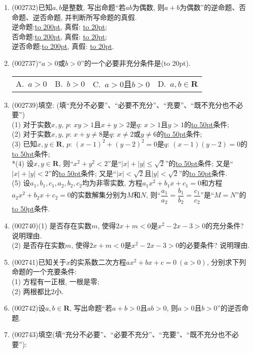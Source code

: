 \documentclass[10pt,a4paper]{article}
\newcommand{\blank}[1]{\underline{\hbox to #1pt{}}}
\newcommand{\bracket}[1]{(\hbox to #1pt{})}
\newcommand{\fourch}[4]{\par\begin{tabular}{p{.23\textwidth}p{.23\textwidth}p{.23\textwidth}p{.23\textwidth}}
A.~#1 &B.~#2& C.~#3& D.~#4
\end{tabular}}
\begin{document}
\begin{enumerate}[1.]
(1) $m\le 0$或$n>0$: \blank{200};\\
(2) 空间三条直线$l,m,n$两两相交: \blank{200};\\
(3) 复数$z_1,z_2,z_3$中至多一个为纯虚数: \blank{200}.
\item {\tiny (002732)}已知$a,b$是整数, 写出命题``若$ab$为偶数, 则$a+b$为偶数''的逆命题、否命题、逆否命题, 并判断所写命题的真假.\\
逆命题:\blank{200}, 真假: \blank{20};\\
否命题:\blank{200}, 真假: \blank{20};\\
逆否命题:\blank{200}, 真假: \blank{20}.
\item {\tiny (002737)}``$a>0$或$b>0$''的一个必要非充分条件是\bracket{20}.
\fourch{$a>0$}{$b>0$}{$a>0$且$b>0$}{$a,b\in \mathbf{R}$}
\item {\tiny (002739)}填空: (填``充分不必要''、``必要不充分''、``充要''、``既不充分也不必要'')\\ 
(1) 对于实数$x,y$, $p$: $xy>1$且$x+y>2$是$q$: $x>1$且$y>1$的\blank{50}条件;\\
(2) 对于实数$x,y$, $p$: $x+y\ne 8$是$q$: $x\ne 2$或$y\ne 6$的\blank{50}条件;\\
(3) 已知$x,y\in \mathbf{R}$, $p$: $(x-1)^2+(y-2)^2=0$是$q$: $(x-1)(y-2)=0$的\blank{50}条件;\\
*(4) 设$x,y\in \mathbf{R}$, 则``$x^2+y^2<2$''是``$|x|+|y|\le \sqrt2$''的\blank{50}条件; 又是``$|x|+|y|<2$''的\blank{50}条件; 又是``$|x|<\sqrt2$且$|y|<\sqrt2$''的\blank{50}条件.\\
(5) 设$a_1,b_1,c_1,a_2,b_2,c_2$均为非零实数, 方程$a_1x^2+b_1x+c_1=0$和方程$a_2x^2+b_2x+c_2=0$的实数解集分别为$M$和$N$, 则``$\dfrac{a_1}{a_2}=\dfrac{b_1}{b_2}=\dfrac{c_1}{c_2}$''是``$M=N$''的\blank{50}条件.
\item {\tiny (002740)}(1) 是否存在实数$m$, 使得$2x+m<0$是${x^2}-2x-3>0$的充分条件? 说明理由.\\
(2) 是否存在实数$m$, 使得$2x+m<0$是$x^2-2x-3>0$的必要条件? 说明理由.
\item {\tiny (002741)}已知关于$x$的实系数二次方程$a x^2 +bx+c=0\ (a>0)$, 分别求下列命题的一个充要条件:\\
(1) 方程有一正根, 一根是零;\\
(2) 两根都比$2$小.
\item {\tiny (002742)}设$a,b\in \mathbf{R}$, 写出命题``若$a+b>0$且$ab>0$, 则$a>0$且$b>0$''的逆否命题.
\item {\tiny (002743)}填空(填``充分不必要''、``必要不充分''、``充要''、``既不充分也不必要''):\\

\end{enumerate}
\end{document}

